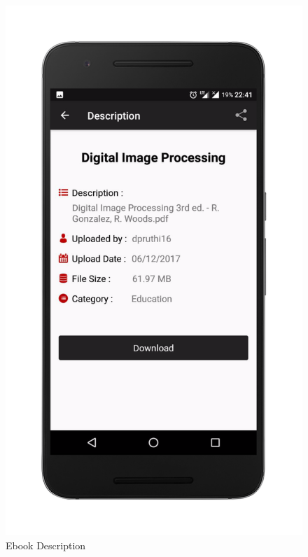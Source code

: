 
\begin{figure}[ht]
\centering
\includegraphics[scale=0.13]{images/de.png}
\caption{Ebook Description}
\end{figure}

\newpage

